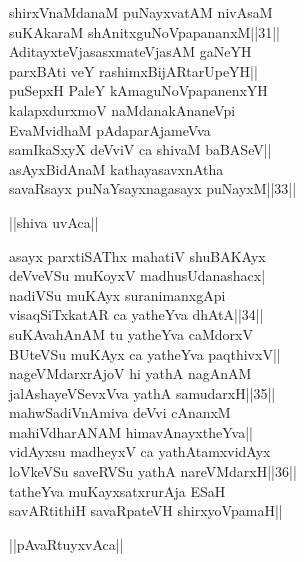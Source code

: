 \documentclass{article}
\begin{document}
shirxVnaMdanaM puNayxvatAM nivAsaM\\
suKAkaraM shAnitxguNoVpapananxM||31||\\
AditayxteVjasasxmateVjasAM gaNeYH\\
parxBAti veY rashimxBijARtarUpeYH||\\
puSepxH PaleY kAmaguNoVpapanenxYH\\
kalapxdurxmoV naMdanakAnaneVpi\\
EvaMvidhaM pAdaparAjameVva\\
samIkaSxyX deVviV ca shivaM baBASeV||\\
asAyxBidAnaM kathayasavxnAtha\\
savaRsayx puNaYsayxnagasayx puNayxM||33||\\

\begin{center}
||shiva uvAca||
\end{center}

asayx parxtiSAThx mahatiV shuBAKAyx\\
deVveVSu muKoyxV madhusUdanashacx|\\
nadiVSu muKAyx suranimanxgApi\\
visaqSiTxkatAR ca yatheYva dhAtA||34||\\
suKAvahAnAM tu yatheYva caMdorxV\\
BUteVSu muKAyx ca yatheYva paqthivxV||\\
nageVMdarxrAjoV hi yathA nagAnAM\\
jalAshayeVSevxVva yathA samudarxH||35||\\
mahwSadiVnAmiva deVvi cAnanxM\\
mahiVdharANAM himavAnayxtheYva||\\
vidAyxsu madheyxV ca yathAtamxvidAyx\\
loVkeVSu saveRVSu yathA nareVMdarxH||36||\\
tatheYva muKayxsatxrurAja ESaH\\
savARtithiH savaRpateVH shirxyoVpamaH||\\

\begin{center}
||pAvaRtuyxvAca||
\end{center}
\end{document}
